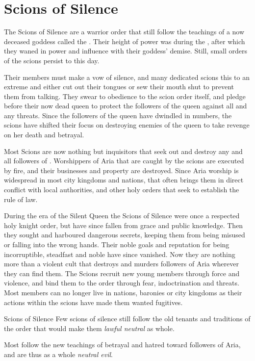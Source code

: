 \section{Scions of Silence}
\label{sec:Scions of Silence}

The Scions of Silence are a warrior order that still follow the teachings of
a now deceased goddess called the . Their height of
power was during the , after which they waned in
power and influence with their goddess' demise. Still, small orders of the
scions persist to this day.

Their members must make a vow of silence, and many dedicated scions this to an
extreme and either cut out their tongues or sew their mouth shut to prevent
them from talking. They swear to obedience to the scion order itself, and
pledge before their now dead queen to protect the followers of the queen
against all and any threats. Since the followers of the queen have dwindled in
numbers, the scions have shifted their focus on destroying enemies of the
queen to take revenge on her death and betrayal.

Most Scions are now nothing but inquisitors that seek out and destroy any and
all followers of . Worshippers of Aria that are caught by
the scions are executed by fire, and their businesses and property are
destroyed. Since Aria worship is widespread in most city kingdoms and nations,
that often brings them in direct conflict with local authorities, and other
holy orders that seek to establish the rule of law.

During the era of the Silent Queen the Scions of Silence were once a respected
holy knight order, but have since fallen from grace and public knowledge. Then
they sought and harboured dangerous secrets, keeping them from being misused
or falling into the wrong hands. Their noble goals and reputation for being
incorruptible, steadfast and noble have since vanished. Now they are nothing
more than a violent cult that destroys and murders followers of Aria wherever
they can find them. The Scions recruit new young members through force and
violence, and bind them to the order through fear, indoctrination and
threats. Most members can no longer live in nations, baronies or city kingdoms
as their actions within the scions have made them wanted fugitives.

\begin{35e}{Scions of Silence}
  Few scions of silence still follow the old tenants and traditions of the order
  that would make them \emph{lawful neutral} as whole.

  Most follow the new teachings of betrayal and hatred toward followers of Aria,
  and are thus as a whole \emph{neutral evil}.
\end{35e}
